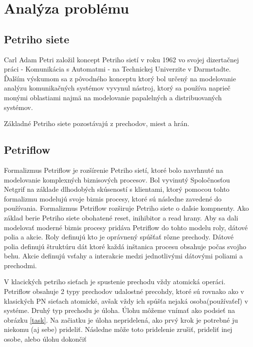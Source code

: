  


\section{Analýza problému} 

  

\subsection{Petriho siete} %

 Carl Adam Petri založil koncept Petriho sietí v roku 1962 vo svojej dizertačnej práci - Komunikácia s Automatmi - na Technickej Univerzite v Darmstadte. Ďalším výskumom sa z pôvodného konceptu ktorý bol určený na modelovanie analýzu komunikačných systémov vyvynul nástroj, ktorý sa používa naprieč monými oblastiami najmä na modelovanie papalelných a distribuovaných systémov. 
 
 Základné Petriho siete pozostávajú z prechodov, miest a hrán. 
  
\subsection{Petriflow} %
\cite{petriflow_clanok}
Formalizmus Petriflow je rozšírenie Petriho sietí, ktoré bolo navrhnuté na modelovanie komplexných biznisových procesov. Bol vyvinutý Spoločnosťou Netgrif na základe dlhodobých skúseností s klientami, ktorý pomocou tohto formalizmu modelujú svoje biznis procesy, ktoré sú následne zavedené do používania. 
Formalizmus Petriflow rozširuje Petriho siete o daľsie kompnenty. Ako základ berie Petriho siete obohatené reset, inihibitor a read hrany. Aby sa dali modelovať moderné biznis procesy pridáva Petriflow do tohto modelu roly, dátové polia a akcie. 
Roly definujú kto je oprávnený spúšťať rôzne prechody. 
Dátové polia definujú štruktúru dát ktoré každá inštanica procesu obsahuje počas svojho behu.
Akcie definujú vsťahy a interakcie medzi jednotlivými dátovými poliami a prechodmi.

V klacických petriho sieťach je spustenie prechodu vždy atomická operáci. Petriflow obsahuje 2 typy prechodov udalostné precohdy, ktoré sú rovnako ako v klasických PN sieťach atomické, avšak vždy ich spúšťa nejaká osoba(používaťeľ) v systéme. Druhý typ prechodu je úloha. Úlohu môžeme vnímať ako podsieť na obrázku \ref{task}. Na začiatku je úloha nepridelená, ako prvý krok je potrebné ju niekomu (aj sebe) prideliť. Následne môže toto pridelenie zrušiť, prideliť inej osobe, alebo úlohu dokončiť


